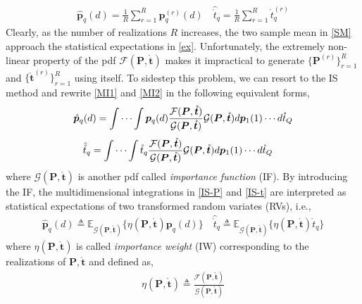 \documentclass[review]{elsarticle}
\begin{document}
\begin{align}\label{SM}
    \hat{\boldsymbol{p}}_q(d)=\frac{1}{R}\sum_{r=1}^R \boldsymbol{p}_q^{(r)}(d) \quad \hat{\mathring{t}}_q=\frac{1}{R}\sum_{r=1}^R \mathring{t}_q^{(r)}
\end{align}
Clearly, as the number of realizations $R$ increases, the two sample mean in \eqref{SM} approach the statistical expectations in \eqref{ex}. Unfortunately, the extremely non-linear property of the pdf $\mathcal{F}(\boldsymbol{P},\mathring{\boldsymbol{t}})$ makes it impractical to generate $\lbrace \boldsymbol{P}^{(r)}\rbrace_{r=1}^R$ and $\lbrace \mathring{\boldsymbol{t}}^{(r)}\rbrace_{r=1}^R$ using itself. To sidestep this problem, we can resort to the IS method \cite{ISdoa2008,Kay2000Mean} and rewrite \eqref{MI1} and \eqref{MI2} in the following equivalent forms,
\begin{align}\label{IS-P}
    \hat{\boldsymbol{p}}_q(d)=\idotsint \boldsymbol{p}_q(d) \frac{\mathcal{F}(\boldsymbol{P},\mathring{\boldsymbol{t}})}{\mathcal{G}(\boldsymbol{P},\mathring{\boldsymbol{t}})}\mathcal{G}(\boldsymbol{P},\mathring{\boldsymbol{t}})d\boldsymbol{p}_1(1) \cdots d\mathring{t}_Q
\end{align}
\begin{align}\label{IS-t}    
    \hat{\mathring{t}}_q&=\idotsint \mathring{t}_q \frac{\mathcal{F}(\boldsymbol{P},\mathring{\boldsymbol{t}})}{\mathcal{G}(\boldsymbol{P},\mathring{\boldsymbol{t}})}\mathcal{G}(\boldsymbol{P},\mathring{\boldsymbol{t}})d\boldsymbol{p}_1(1) \cdots d\mathring{t}_Q
\end{align}
where $\mathcal{G}(\boldsymbol{P},\mathring{\boldsymbol{t}})$ is another pdf called \emph{importance function} (IF). By introducing the IF, the multidimensional integrations in \eqref{IS-P} and \eqref{IS-t} are interpreted as statistical expectations of two transformed random variates (RVs), i.e.,
\begin{align}\label{IS-ex}
    \hat{\boldsymbol{p}}_q(d)\triangleq \mathbb{E}_{\mathcal{G}(\boldsymbol{P},\mathring{\boldsymbol{t}})}\{\eta(\boldsymbol{P},\mathring{\boldsymbol{t}})\boldsymbol{p}_q(d)\} \quad \hat{\mathring{t}}_q\triangleq \mathbb{E}_{\mathcal{G}(\boldsymbol{P},\mathring{\boldsymbol{t}})}\{\eta(\boldsymbol{P},\mathring{\boldsymbol{t}})\mathring{t}_q\}
\end{align}
where $\eta(\boldsymbol{P},\mathring{\boldsymbol{t}})$ is called \emph{importance weight} (IW) corresponding to the realizations of $\boldsymbol{P},\mathring{\boldsymbol{t}}$ and defined as,
\begin{align}\label{eta}
    \eta(\boldsymbol{P},\mathring{\boldsymbol{t}})\triangleq\frac{\mathcal{F}(\boldsymbol{P},\mathring{\boldsymbol{t}})}{\mathcal{G}(\boldsymbol{P},\mathring{\boldsymbol{t}})}
\end{align}
\end{document}

